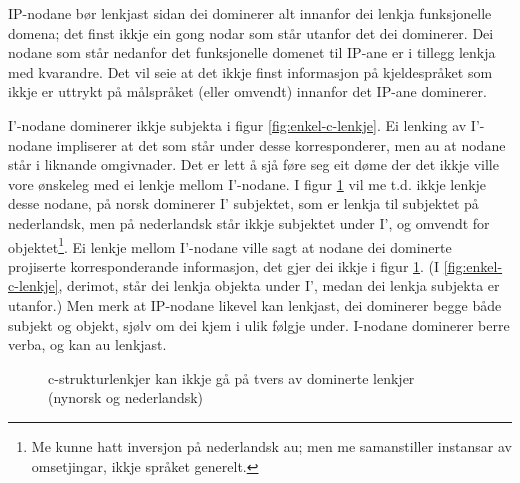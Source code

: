 \documentclass[12pt,a4paper,oneside,draft]{report}
\newcommand{\proj}[2]{\begin{tabular}{c}\footnotesize{#1}\\\normalsize{#2}\end{tabular}}
\newcommand{\ua}{\ensuremath{\uparrow}}
\newcommand{\da}{\ensuremath{\downarrow}}
\begin{document}
IP-nodane bør lenkjast sidan dei dominerer alt innanfor dei
lenkja funksjonelle domena; det finst ikkje ein gong nodar som står
utanfor det dei dominerer. Dei nodane som står nedanfor det funksjonelle
domenet til IP-ane er i tillegg lenkja med kvarandre. Det vil seie at
det ikkje finst informasjon på kjeldespråket som ikkje er uttrykt på
målspråket (eller omvendt) innanfor det IP-ane dominerer.

I'-nodane dominerer ikkje subjekta i figur
 \ref{fig:enkel-c-lenkje}. Ei lenking av I'-nodane impliserer at det
 som står under desse korresponderer, men au at nodane står i liknande
 omgivnader. Det er lett å sjå føre seg eit døme der det ikkje ville
 vore ønskeleg med ei lenkje mellom I'-nodane. I figur
 \ref{fig:ikkje-c-lenkje} vil me t.d. ikkje lenkje desse nodane, på
 norsk dominerer I' subjektet, som er lenkja til subjektet på
 nederlandsk, men på nederlandsk står ikkje subjektet under I', og
 omvendt for objektet\footnote{Me kunne hatt inversjon på nederlandsk au; men me samanstiller
        instansar av omsetjingar, ikkje språket generelt. }. Ei lenkje mellom I'-nodane ville sagt at
 nodane dei dominerte projiserte korresponderande informasjon, det
 gjer dei ikkje i figur \ref{fig:ikkje-c-lenkje}. (I
 \ref{fig:enkel-c-lenkje}, derimot, står dei lenkja objekta under I',
 medan dei lenkja subjekta er utanfor.) Men merk at IP-nodane likevel
 kan lenkjast, dei dominerer begge både subjekt og objekt, sjølv om
 dei kjem i ulik følgje under.  I-nodane dominerer berre verba, og kan
 au lenkjast.

\begin{figure}[htp]
\centering
   \caption{c\hyp{}strukturlenkjer kan ikkje gå på tvers av dominerte
   lenkjer (nynorsk og nederlandsk)}
   \label{fig:ikkje-c-lenkje}
  \end{figure}
\end{document}
